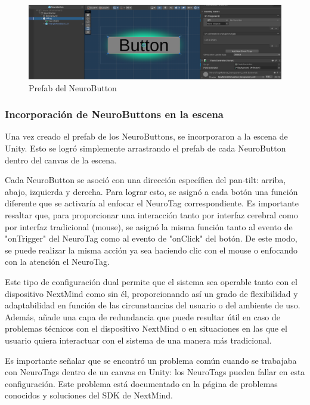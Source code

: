 \begin{figure}[!htb]
\centering
\includegraphics[width=1\linewidth]{figures/prefab-neurobutton.png}
\caption{Prefab del NeuroButton}
\label{figure:prefab-neurobutton}
\end{figure}


\subsubsection{Incorporación de NeuroButtons en la escena}

Una vez creado el prefab de los NeuroButtons, se incorporaron a la escena de Unity. Esto se logró simplemente arrastrando el prefab de cada NeuroButton dentro del canvas de la escena.



Cada NeuroButton se asoció con una dirección específica del pan-tilt: arriba, abajo, izquierda y derecha. Para lograr esto, se asignó a cada botón una función diferente que se activaría al enfocar el NeuroTag correspondiente. Es importante resaltar que, para proporcionar una interacción tanto por interfaz cerebral como por interfaz tradicional (mouse), se asignó la misma función tanto al evento de "onTrigger" del NeuroTag como al evento de "onClick" del botón. De este modo, se puede realizar la misma acción ya sea haciendo clic con el mouse o enfocando con la atención el NeuroTag.



Este tipo de configuración dual permite que el sistema sea operable tanto con el dispositivo NextMind como sin él, proporcionando así un grado de flexibilidad y adaptabilidad en función de las circunstancias del usuario o del ambiente de uso. Además, añade una capa de redundancia que puede resultar útil en caso de problemas técnicos con el dispositivo NextMind o en situaciones en las que el usuario quiera interactuar con el sistema de una manera más tradicional.



Es importante señalar que se encontró un problema común cuando se trabajaba con NeuroTags dentro de un canvas en Unity: los NeuroTags pueden fallar en esta configuración. Este problema está documentado en la página de problemas conocidos y soluciones del SDK de NextMind\cite{NextMindKnownIssues}.




